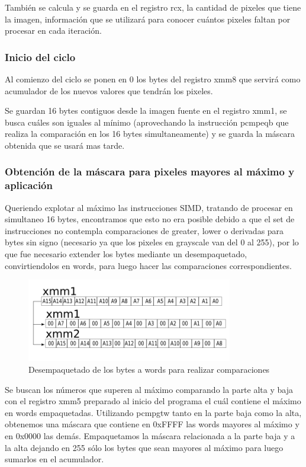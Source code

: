 También se calcula y se guarda en el registro rcx, la cantidad de pixeles que tiene la imagen, información que se utilizará para conocer cuántos pixeles faltan por procesar en cada iteración.

\subsubsection{Inicio del ciclo}
Al comienzo del ciclo se ponen en 0 los bytes del registro xmm8 que servirá como acumulador de los nuevos valores que tendrán los pixeles.

Se guardan 16 bytes contiguos desde la imagen fuente en el registro xmm1, se busca cuáles son iguales al mínimo (aprovechando la instrucción pcmpeqb que realiza la comparación en los 16 bytes simultaneamente) y se guarda la máscara obtenida que se usará mas tarde.

\subsubsection{Obtención de la máscara para pixeles mayores al máximo y aplicación}

Queriendo explotar al máximo las instrucciones SIMD, tratando de procesar en simultaneo 16 bytes, encontramos que esto no era posible debido a que el set de instrucciones no contempla comparaciones de greater, lower o derivadas para bytes sin signo (necesario ya que los pixeles en grayscale van del 0 al 255), por lo que fue necesario extender los bytes mediante un desempaquetado, convirtiendolos en words, para luego hacer las comparaciones correspondientes.

\begin{figure}[H]
\centering
\includegraphics[width=90mm]{unpackxmm1.png}
\caption{Desempaquetado de los bytes a words para realizar comparaciones}
\label{overflow}
\end{figure}

Se buscan los números que superen al máximo comparando la parte alta y baja con el registro xmm5 preparado al inicio del programa el cuál contiene el máximo en words empaquetadas. Utilizando pcmpgtw tanto en la parte baja como la alta, obtenemos una máscara que contiene en 0xFFFF las words mayores al máximo y en 0x0000 las demás. Empaquetamos la máscara relacionada a la parte baja y a la alta dejando en 255 sólo los bytes que sean mayores al máximo para luego sumarlos en el acumulador.

